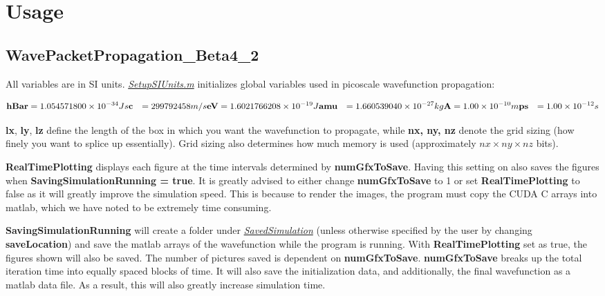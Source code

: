 \documentclass[11pt,letterpaper]{article}
\renewcommand{\\}{\bigskip}
\begin{document}
\section{Usage}

\subsection{WavePacketPropagation\_Beta4\_2} 

All variables are in SI units. \underline{\textit{SetupSIUnits.m}} initializes global variables used in picoscale wavefunction propagation:

\begin{align*}
    \textbf{hBar} &= 1.054571800 \times 10^{-34} Js\\
    \textbf{c} &= 299792458 m/s\\
    \textbf{eV} &= 1.6021766208 \times 10^{-19} J\\
    \textbf{amu} &=  1.660539040 \times 10^{-27} kg\\
    \textbf{A} &= 1.00 \times 10^{-10} m\\
    \textbf{ps} &= 1.00 \times 10^{-12} s
\end{align*}

\textbf{lx}, \textbf{ly}, \textbf{lz} define the length of the box in which you want the wavefunction to propagate, while \textbf{nx, ny, nz} denote the grid sizing (how finely you want to splice up essentially). Grid sizing also determines how much memory is used (approximately $nx \times ny \times nz$ bits).\\

\textbf{RealTimePlotting} displays each figure at the time intervals determined by \textbf{numGfxToSave}. Having this setting on also saves the figures when \textbf{SavingSimulationRunning = true}. It is greatly advised to either change \textbf{numGfxToSave} to 1 or set \textbf{RealTimePlotting} to false as it will greatly improve the simulation speed. This is because to render the images, the program must copy the CUDA C arrays into matlab, which we have noted to be extremely time consuming.\\

\textbf{SavingSimulationRunning} will create a folder under \underline{\textit{SavedSimulation}} (unless otherwise specified by the user by changing \textbf{saveLocation}) and save the matlab arrays of the wavefunction while the program is running. With \textbf{RealTimePlotting} set as true, the figures shown will also be saved. The number of pictures saved is dependent on \textbf{numGfxToSave}. \textbf{numGfxToSave} breaks up the total iteration time into equally spaced blocks of time. It will also save the initialization data, and additionally, the final wavefunction as a matlab data file. As a result, this will also greatly increase simulation time.\\
\end{document}

